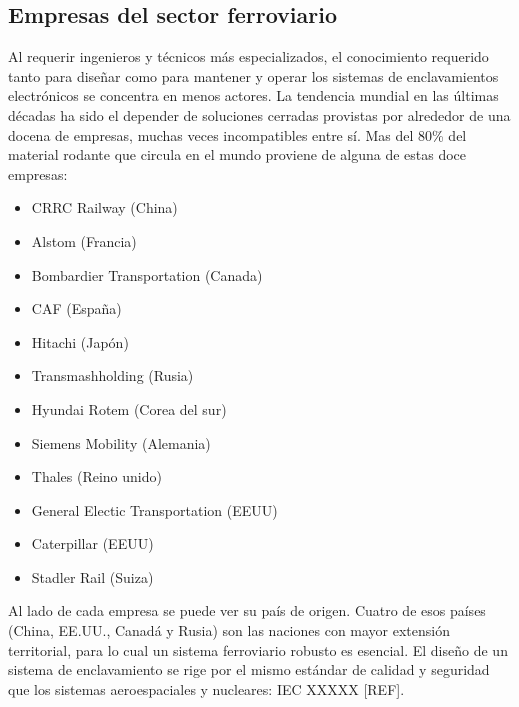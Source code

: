 \subsection{Empresas del sector ferroviario}

    Al requerir ingenieros y técnicos más especializados, el conocimiento requerido tanto para diseñar como para mantener y operar los sistemas de enclavamientos electrónicos se concentra en menos actores. La tendencia mundial en las últimas décadas ha sido el depender de soluciones cerradas provistas por alrededor de una docena de empresas, muchas veces incompatibles entre sí. Mas del 80\% del material rodante que circula en el mundo proviene de alguna de estas doce empresas:

    \begin{itemize}
        \item CRRC Railway (China)
        \item Alstom (Francia)
        \item Bombardier Transportation (Canada)
        \item CAF (España)
        \item Hitachi (Japón)
        \item Transmashholding (Rusia)
        \item Hyundai Rotem (Corea del sur)
        \item Siemens Mobility (Alemania)
        \item Thales (Reino unido)
        \item General Electic Transportation (EEUU)
        \item Caterpillar (EEUU)
        \item Stadler Rail (Suiza)
    \end{itemize}
    
    Al lado de cada empresa se puede ver su país de origen. Cuatro de esos países (China, EE.UU., Canadá y Rusia) son las naciones con mayor extensión territorial, para lo cual un sistema ferroviario robusto es esencial. El diseño de un sistema de enclavamiento se rige por el mismo estándar de calidad y seguridad que los sistemas aeroespaciales y nucleares: IEC XXXXX [REF].

    